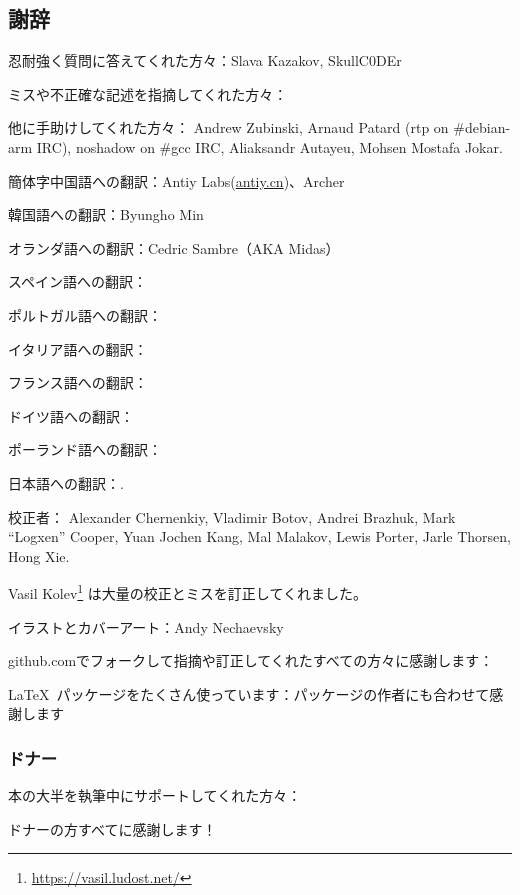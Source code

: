 \subsection*{謝辞}

忍耐強く質問に答えてくれた方々：Slava  Kazakov, SkullC0DEr

ミスや不正確な記述を指摘してくれた方々：\PeopleMistakesInaccuracies{}

他に手助けしてくれた方々：
Andrew Zubinski,
Arnaud Patard (rtp on \#debian-arm IRC),
noshadow on \#gcc IRC,
Aliaksandr Autayeu,
Mohsen Mostafa Jokar.

簡体字中国語への翻訳：Antiy Labs(\href{http://antiy.cn}{antiy.cn})、Archer

韓国語への翻訳：Byungho Min

オランダ語への翻訳：Cedric Sambre（AKA Midas）

スペイン語への翻訳： \PeopleSpanishTranslators{}

ポルトガル語への翻訳：\PeoplePTBRTranslators{}

イタリア語への翻訳：\PeopleItalianTranslators{}

フランス語への翻訳：\PeopleFrenchTranslators{}

ドイツ語への翻訳：\PeopleGermanTranslators{}

ポーランド語への翻訳：\PeoplePolishTranslators{}

日本語への翻訳：\PeopleJapaneseTranslators{}.

校正者：
Alexander  Chernenkiy,
Vladimir Botov,
Andrei Brazhuk,
Mark ``Logxen'' Cooper, Yuan Jochen Kang, Mal Malakov, Lewis Porter, Jarle Thorsen, Hong Xie.

Vasil Kolev\footnote{\url{https://vasil.ludost.net/}} は大量の校正とミスを訂正してくれました。

イラストとカバーアート：Andy Nechaevsky

github.comでフォークして指摘や訂正してくれたすべての方々に感謝します：\FNGithubContributors{}

\LaTeX\ パッケージをたくさん使っています：パッケージの作者にも合わせて感謝します

\subsubsection*{ドナー}

本の大半を執筆中にサポートしてくれた方々：



ドナーの方すべてに感謝します！
